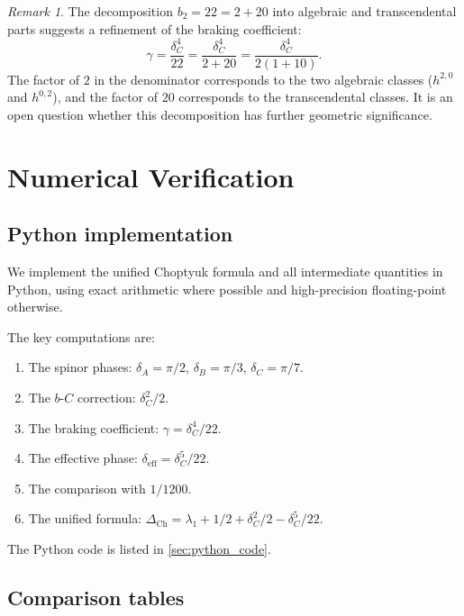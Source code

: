 \documentclass[12pt,a4paper]{article}
\theoremstyle{definition}
\theoremstyle{remark}
\newtheorem{remark}[theorem]{Remark}
\begin{document}
\begin{remark}
The decomposition $b_2 = 22 = 2 + 20$ into algebraic and transcendental parts suggests a refinement of the braking coefficient:
\begin{equation}
\gamma = \frac{\delta_C^4}{22} = \frac{\delta_C^4}{2 + 20} = \frac{\delta_C^4}{2(1 + 10)}.
\end{equation}
The factor of $2$ in the denominator corresponds to the two algebraic classes ($h^{2,0}$ and $h^{0,2}$), and the factor of $20$ corresponds to the transcendental classes. It is an open question whether this decomposition has further geometric significance.
\end{remark}

\section{Numerical Verification}
\label{sec:numerical}

\subsection{Python implementation}

We implement the unified Choptyuk formula and all intermediate quantities in Python, using exact arithmetic where possible and high-precision floating-point otherwise.

The key computations are:
\begin{enumerate}
\item The spinor phases: $\delta_A = \pi/2$, $\delta_B = \pi/3$, $\delta_C = \pi/7$.
\item The $b$-$C$ correction: $\delta_C^2/2$.
\item The braking coefficient: $\gamma = \delta_C^4/22$.
\item The effective phase: $\delta_{\mathrm{eff}} = \delta_C^5/22$.
\item The comparison with $1/1200$.
\item The unified formula: $\Delta_{\mathrm{Ch}} = \lambda_1 + 1/2 + \delta_C^2/2 - \delta_C^5/22$.
\end{enumerate}

The Python code is listed in \cref{sec:python_code}.

\subsection{Comparison tables}
\end{document}
